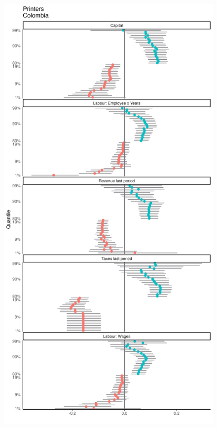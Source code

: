 \documentclass[
  12pt]{article}
\theoremstyle{definition}
\theoremstyle{remark}
\begin{document}
\begin{figure}

{\centering \includegraphics[width=\textwidth,height=1\textheight]{../Results/Figures/Colombia/342_by_size_diff.png}

}

\end{figure}
\end{document}
